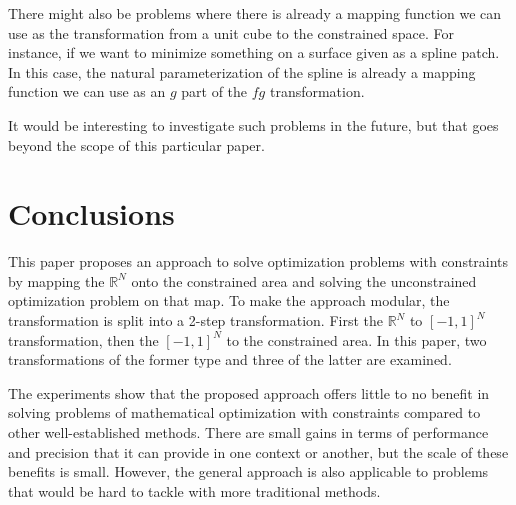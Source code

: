 \documentclass[
	a4paper, %
	10pt, %
	unnumberedsections, %
	twoside, %
]{LTJournalArticle}
\begin{document}
There might also be problems where there is already a mapping function we can use as the transformation from a unit cube to the constrained space. For instance, if we want to minimize something on a surface given as a spline patch. In this case, the natural parameterization of the spline is already a mapping function we can use as an $g$ part of the $fg$ transformation.

It would be interesting to investigate such problems in the future, but that goes beyond the scope of this particular paper.

\section{Conclusions}

This paper proposes an approach to solve optimization problems with constraints by mapping the $\mathbb{R}^N$ onto the constrained area and solving the unconstrained optimization problem on that map. To make the approach modular, the transformation is split into a 2-step transformation. First the $\mathbb{R}^N$ to $[-1, 1]^N$ transformation, then the $[-1, 1]^N$ to the constrained area. In this paper, two transformations of the former type and three of the latter are examined.

The experiments show that the proposed approach offers little to no benefit in solving problems of mathematical optimization with constraints compared to other well-established methods. There are small gains in terms of performance and precision that it can provide in one context or another, but the scale of these benefits is small. However, the general approach is also applicable to problems that would be hard to tackle with more traditional methods.



\printbibliography %

\end{document}
